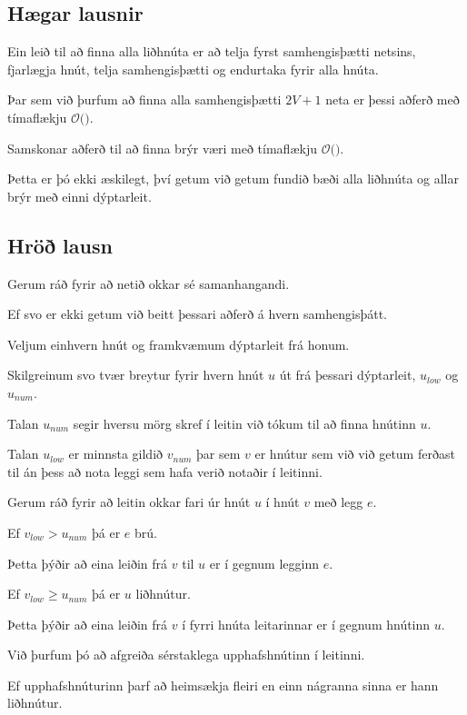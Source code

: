 \subsection{Hægar lausnir}
{
	{
		\item<1-> Ein leið til að finna alla liðhnúta er að telja fyrst samhengisþætti netsins, fjarlægja hnút, telja samhengisþætti
					og endurtaka fyrir alla hnúta.
		\item<2-> Þar sem við þurfum að finna alla samhengisþætti $2V + 1$ neta er þessi aðferð með tímaflækju $\mathcal{O}($\onslide<3->{$V^2 + VE$}$)$.
		\item<4-> Samskonar aðferð til að finna brýr væri með tímaflækju $\mathcal{O}($\onslide<5->{$E^2 + VE$}$)$.
		\item<6-> Þetta er þó ekki æskilegt, því getum við getum fundið bæði alla liðhnúta og allar brýr með einni dýptarleit.
	}
}

\subsection{Hröð lausn}
{
	{
		\item<1-> Gerum ráð fyrir að netið okkar sé samanhangandi.
		\item<2-> Ef svo er ekki getum við beitt þessari aðferð á hvern samhengisþátt.
		\item<3-> Veljum einhvern hnút og framkvæmum dýptarleit frá honum.
		\item<4-> Skilgreinum svo tvær breytur fyrir hvern hnút $u$ út frá þessari dýptarleit, $u_{low}$ og $u_{num}$.
		\item<5-> Talan $u_{num}$ segir hversu mörg skref í leitin við tókum til að finna hnútinn $u$.
		\item<6-> Talan $u_{low}$ er minnsta gildið $v_{num}$ þar sem $v$ er hnútur sem við við getum ferðast til án þess að nota leggi
					sem hafa verið notaðir í leitinni.
	}
}

{
	{
		\item<1-> Gerum ráð fyrir að leitin okkar fari úr hnút $u$ í hnút $v$ með legg $e$.
		\item<2-> Ef $v_{low} > u_{num}$ þá er $e$ brú.
		\item<3-> Þetta þýðir að eina leiðin frá $v$ til $u$ er í gegnum legginn $e$.
		\item<4-> Ef $v_{low} \geq u_{num}$ þá er $u$ liðhnútur.
		\item<5-> Þetta þýðir að eina leiðin frá $v$ í fyrri hnúta leitarinnar er í gegnum hnútinn $u$.
		\item<6-> Við þurfum þó að afgreiða sérstaklega upphafshnútinn í leitinni.
		\item<7-> Ef upphafshnúturinn þarf að heimsækja fleiri en einn nágranna sinna er hann liðhnútur.
	}
}


